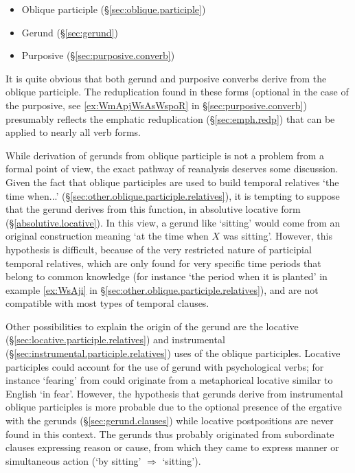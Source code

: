 \begin{itemize}
\item Oblique participle (§\ref{sec:oblique.participle})
\item Gerund (§\ref{sec:gerund})
\item Purposive (§\ref{sec:purposive.converb})
\end{itemize}

It is quite obvious that both gerund and purposive converbs derive from the oblique participle. The reduplication found in these forms (optional in the case of the purposive, see \ref{ex:WmApjWsAsWspoR} in §\ref{sec:purposive.converb}) presumably reflects the emphatic reduplication (§\ref{sec:emph.redp}) that can be applied to nearly all verb forms.


While derivation of gerunds from oblique participle is not a problem from a formal point of view, the exact pathway of reanalysis deserves some discussion. Given the fact that oblique participles are used to build temporal relatives `the time when...' (§\ref{sec:other.oblique.participle.relatives}), it is tempting to suppose that the gerund derives from this function, in absolutive locative form (§\ref{absolutive.locative}). In this view, a gerund like  `sitting' would come from an original construction meaning `at the time when $X$ was sitting'. However, this hypothesis is difficult, because of the very restricted nature of participial temporal relatives, which are only found for very specific time periods that belong to common knowledge (for instance  `the period when it is planted' in example \ref{ex:WsAji} in §\ref{sec:other.oblique.participle.relatives}), and are not compatible with most types of temporal clauses.

Other possibilities to explain the origin of the gerund are the locative (§\ref{sec:locative.participle.relatives}) and instrumental (§\ref{sec:instrumental.participle.relatives}) uses of the oblique participles. Locative participles could account for the use of gerund with psychological verbs; for instance  `fearing' from  could originate from a metaphorical locative similar to English `in fear'. However, the hypothesis that gerunds derive from instrumental oblique participles is more probable due to the optional presence of the ergative  with the gerunds (§\ref{sec:gerund.clauses}) while locative postpositions are never found in this context. The gerunds thus probably originated from subordinate clauses expressing reason or cause, from which they came to express manner or simultaneous action (`by sitting' $\Rightarrow$ `sitting').

